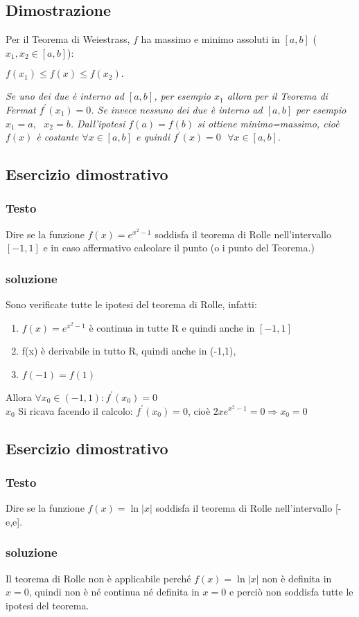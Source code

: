 \documentclass{book}
\begin{document}
\subsection{Dimostrazione}
Per il Teorema di Weiestrass, $f$ ha massimo e minimo assoluti in $[a,b]$
($x_1,x_2\in[a,b]$):
\begin{center}
	$f(x_1)\leq f(x)\leq f(x_2).$
\end{center}
\textit{Se uno dei due è interno ad $[a,b]$, per esempio $x_1$ allora per il
Teorema di Fermat $f^\prime(x_1)=0$. Se invece nessuno dei due è interno ad
$[a,b]$ per esempio $x_1=a, \text{ } x_2=b$. Dall'ipotesi $f(a)=f(b)$ si ottiene
minimo=massimo, cioè $f(x)$ è costante $\forall x \in[a,b]$ e quindi
$f^\prime(x)=0\text{ } \forall x \in [a,b]$}.
\subsection{Esercizio dimostrativo}
\subsubsection{Testo}
Dire se la funzione $f(x)=e^{x^2-1}$ soddisfa il teorema di Rolle
nell'intervallo $[-1,1]$ e in caso affermativo calcolare il punto (o i punto
del Teorema.)
\subsubsection{soluzione}
Sono verificate tutte le ipotesi del teorema di Rolle, infatti:
\begin{enumerate}
	\item $f(x)=e^{x^2-1}$ è continua in tutte R e quindi anche in $[-1,1]$
	\item f(x) è derivabile in tutto R, quindi anche in (-1,1),
	\item $f(-1)=f(1)$
\end{enumerate}
Allora $\forall x_0 \in (-1,1):f^\prime(x_0)=0$\\
$x_0$ Si ricava facendo il calcolo: $f^\prime (x_0)=0$, cioè
$2xe^{x^2-1}=0\Rightarrow x_0=0$
\subsection{Esercizio dimostrativo}
\subsubsection{Testo}
Dire se la funzione $f(x)=\ln|x|$ soddisfa il teorema di Rolle nell'intervallo
[-e,e].
\subsubsection{soluzione}
Il teorema di Rolle non è applicabile perché $f(x)=\ln|x|$ non è definita in
$x=0$, quindi non è né continua né definita in $x=0$ e perciò non soddisfa
tutte le ipotesi del teorema.
\end{document}
